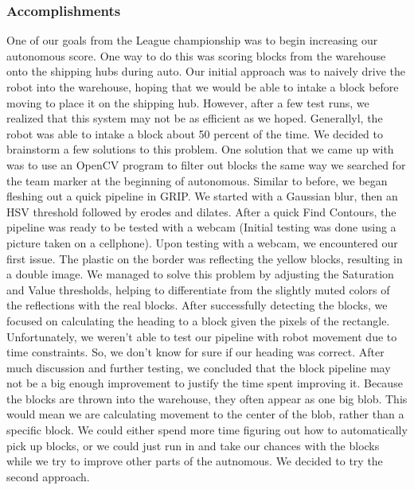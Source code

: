 \subsubsection*{Accomplishments}
One of our goals from the League championship was to begin increasing our autonomous score. One way to do this was scoring blocks from the warehouse onto the shipping hubs during auto. Our initial approach was to naively drive the robot into the warehouse, hoping that we would be able to intake a block before moving to place it on the shipping hub. However, after a few test runs, we realized that this system may not be as efficient as we hoped. Generallyl, the robot was able to intake a block about 50 percent of the time. We decided to brainstorm a few solutions to this problem.
One solution that we came up with was to use an OpenCV program to filter out blocks the same way we searched for the team marker at the beginning of autonomous. 
Similar to before, we began fleshing out a quick pipeline in GRIP. We started with a Gaussian blur, then an HSV threshold followed by erodes and dilates. After a quick Find Contours, the pipeline was ready to be tested with a webcam (Initial testing was done using a picture taken on a cellphone).
Upon testing with a webcam, we encountered our first issue. The plastic on the border was reflecting the yellow blocks, resulting in a double image. We managed to solve this problem by adjusting the Saturation and Value thresholds, helping to differentiate from the slightly muted colors of the reflections with the real blocks. 
After successfully detecting the blocks, we focused on calculating the heading to a block given the pixels of the rectangle. Unfortunately, we weren't able to test our pipeline with robot movement due to time constraints. So, we don't know for sure if our heading was correct. 
After much discussion and further testing, we concluded that the block pipeline may not be a big enough improvement to justify the time spent improving it. Because the blocks are thrown into the warehouse, they often appear as one big blob. This would mean we are calculating movement to the center of the blob, rather than a specific block. We could either spend more time figuring out how to automatically pick up blocks, or we could just run in and take our chances with the blocks while we try to improve other parts of the autnomous. We decided to try the second approach. 


